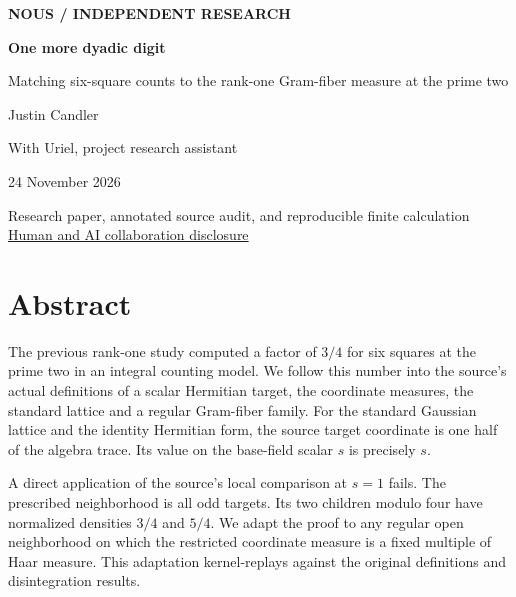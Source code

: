 \documentclass[12pt,letterpaper]{article}
\begin{document}


\thispagestyle{empty}\begin{center}\vspace*{.42in}
{\sffamily\small\bfseries\color{accent}NOUS / INDEPENDENT RESEARCH}\par\vspace{.65in}
{\fontsize{34}{39}\selectfont\bfseries\color{ink}One more dyadic digit}\par\vspace{.3in}
\begin{minipage}{.88\linewidth}\centering\Large Matching six-square counts to the rank-one Gram-fiber measure at the prime two\end{minipage}\par\vspace{.55in}
{\large Justin Candler}\par With Uriel, project research assistant\par\vspace{.14in}24 November 2026\par\vspace{.5in}
\end{center}\vfill
\begin{center}\small Research paper, annotated source audit, and reproducible finite calculation\\
\hyperref[collab]{Human and AI collaboration disclosure}\end{center}

\clearpage{}\section*{Abstract}
The previous rank-one study computed a factor of \(3/4\) for six squares at the prime two in an integral counting model. We follow this number into the source's actual definitions of a scalar Hermitian target, the coordinate measures, the standard lattice and a regular Gram-fiber family. For the standard Gaussian lattice and the identity Hermitian form, the source target coordinate is one half of the algebra trace. Its value on the base-field scalar \(s\) is precisely \(s\).

A direct application of the source's local comparison at \(s=1\) fails. The prescribed neighborhood is all odd targets. Its two children modulo four have normalized densities \(3/4\) and \(5/4\). We adapt the proof to any regular open neighborhood on which the restricted coordinate measure is a fixed multiple of Haar measure. This adaptation kernel-replays against the original definitions and disintegration results.
\end{document}
